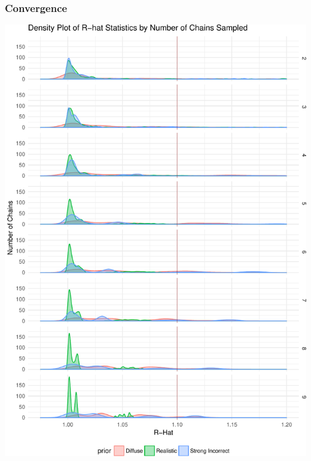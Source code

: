 \documentclass{beamer}
\begin{document}
\begin{frame}
	\frametitle{Convergence}
	\begin{center}
	\includegraphics[scale=.30]{denisty_convergence.pdf}

\end{center}
\end{frame}
\end{document}
